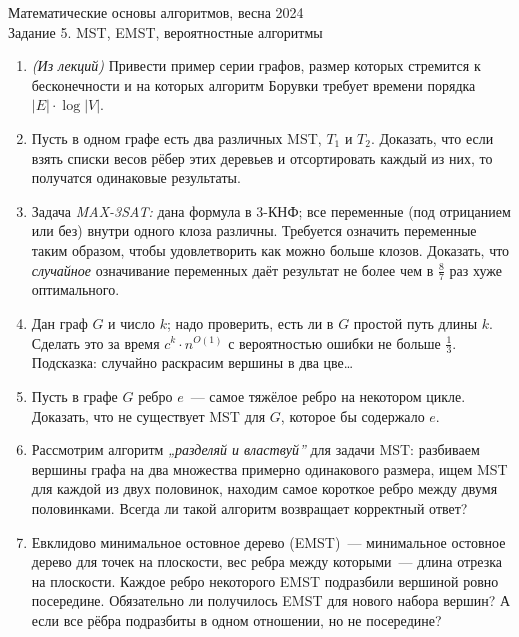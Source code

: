 \documentclass[a4paper,11pt]{article}
\begin{document}
\begin{center}
	\Large Математические основы алгоритмов, весна 2024 \\
	\Large Задание 5. MST, EMST, вероятностные алгоритмы
\end{center}

\begin{enumerate}

	\item {\it (Из лекций)} Привести пример серии графов, размер которых стремится к бесконечности и на которых алгоритм Борувки требует времени порядка \(|E| \cdot \log |V|\).

	\item Пусть в одном графе есть два различных MST, \(T_1\) и \(T_2\). Доказать, что если взять списки весов рёбер этих деревьев и отсортировать каждый из них, то получатся одинаковые результаты.

	\item Задача {\it MAX-3SAT:} дана формула в 3-КНФ; все переменные (под отрицанием или без) внутри одного клоза различны. Требуется означить переменные таким образом, чтобы удовлетворить как можно больше клозов. Доказать, что {\it случайное} означивание переменных даёт результат не более чем в \(\frac87\) раз хуже оптимального.

	\item Дан граф \(G\) и число \(k\); надо проверить, есть ли в \(G\) простой путь длины \(k\). Сделать это за время \(c^k \cdot n^{O(1)}\) с вероятностью ошибки не больше \(\tfrac{1}{3}\). Подсказка: случайно раскрасим вершины в два цве\ldots

	\item Пусть в графе \(G\) ребро \(e\)~— самое тяжёлое ребро на некотором цикле. Доказать, что не существует MST для \(G\), которое бы содержало \(e\).

	\item Рассмотрим алгоритм {\it „разделяй и властвуй”} для задачи MST: разбиваем вершины графа на два множества примерно одинакового размера, ищем MST для каждой из двух половинок, находим самое короткое ребро между двумя половинками. Всегда ли такой алгоритм возвращает корректный ответ?

	\item Евклидово минимальное остовное дерево (EMST)~— минимальное остовное дерево для точек на плоскости, вес ребра между которыми~— длина отрезка на плоскости. Каждое ребро некоторого EMST подразбили вершиной ровно посередине. Обязательно ли получилось EMST для нового набора вершин? А если все рёбра подразбиты в одном отношении, но не посередине?


\end{enumerate}
\end{document}
